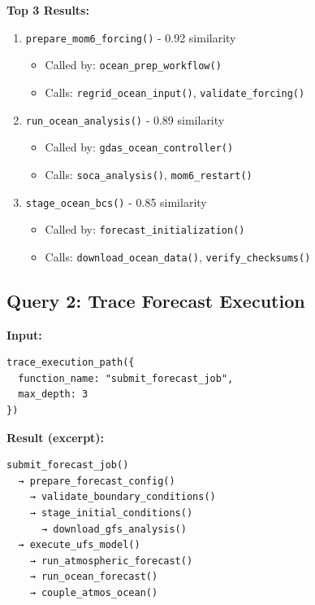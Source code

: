 \documentclass[11pt,letterpaper]{article}
\begin{document}
\textbf{Top 3 Results:}
\begin{enumerate}
    \item \texttt{prepare\_mom6\_forcing()} - 0.92 similarity
    \begin{itemize}
        \item Called by: \texttt{ocean\_prep\_workflow()}
        \item Calls: \texttt{regrid\_ocean\_input()}, \texttt{validate\_forcing()}
    \end{itemize}
    
    \item \texttt{run\_ocean\_analysis()} - 0.89 similarity
    \begin{itemize}
        \item Called by: \texttt{gdas\_ocean\_controller()}
        \item Calls: \texttt{soca\_analysis()}, \texttt{mom6\_restart()}
    \end{itemize}
    
    \item \texttt{stage\_ocean\_bcs()} - 0.85 similarity
    \begin{itemize}
        \item Called by: \texttt{forecast\_initialization()}
        \item Calls: \texttt{download\_ocean\_data()}, \texttt{verify\_checksums()}
    \end{itemize}
\end{enumerate}

\subsection{Query 2: Trace Forecast Execution}

\textbf{Input:}
\begin{lstlisting}
trace_execution_path({
  function_name: "submit_forecast_job",
  max_depth: 3
})
\end{lstlisting}

\textbf{Result (excerpt):}
\begin{verbatim}
submit_forecast_job()
  → prepare_forecast_config()
    → validate_boundary_conditions()
    → stage_initial_conditions()
      → download_gfs_analysis()
  → execute_ufs_model()
    → run_atmospheric_forecast()
    → run_ocean_forecast()
    → couple_atmos_ocean()
\end{verbatim}
\end{document}
